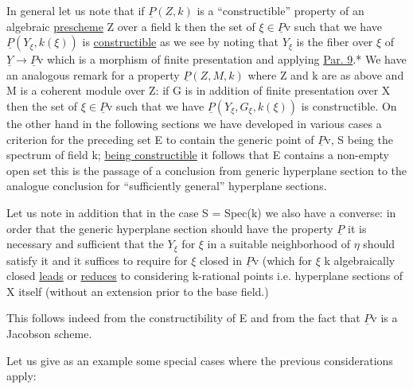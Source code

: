 
In general let us note that if $\underline{P}(Z,k)$ is a ``constructible''
property of an algebraic \uline{prescheme} Z over a field k then the set
of $\xi \in \underline{P}$v such that we have $\underline{P}(Y_\xi, k(\xi))$ is \uline{constructible} as we see
by noting that $Y_\xi$ is the fiber over $\xi$ of $\underline{Y} \to \underline{P}$v which is a morphism
of finite presentation and applying \uline{Par. 9}.* We have an analogous
remark for a property $\underline{P}(Z, M, k)$ where Z and k are as above and M
is a coherent module over Z: if G is in addition of
finite presentation over X then the set of $\xi \in \underline{P}$v such that we have
$\underline{P}(Y_\xi, G_\xi, k(\xi))$ is constructible. On the other hand in the
following sections we have developed in various cases a criterion
for the preceding set E to contain the generic point of $\underline{P}$v, S being
the spectrum of field k; \uline{being constructible} it follows that E
contains a non-empty open set this is the passage of a conclusion
from generic hyperplane section to the analogue conclusion for
``sufficiently general'' hyperplane sections.

Let us note in addition that in the case S = Spec(k) we also
have a converse: in order that the generic hyperplane section
should have the property $\underline{P}$ it is necessary and sufficient that the
$Y_\xi$ for $\xi$ in a suitable neighborhood of $\eta$ should satisfy it and it
suffices to require for $\xi$ closed in $\underline{P}$v (which for $\xi$ k algebraically
closed \uline{leads} or \uline{reduces} to considering k-rational points i.e.
hyperplane sections of X itself (without an extension prior to the
base field.)

This follows indeed from the constructibility of E and from
the fact that $\underline{P}$v is a Jacobson scheme.

Let us give as an example some special cases where the
previous considerations apply:

